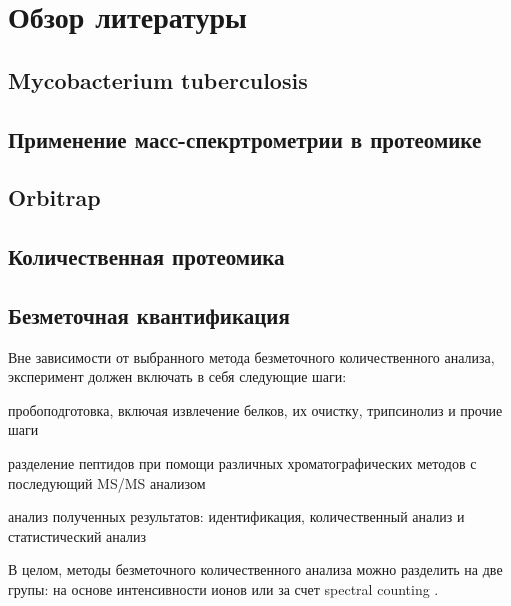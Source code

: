 \section{Обзор литературы}

\subsection{Mycobacterium tuberculosis}

\subsection{Применение масс-спекртрометрии в протеомике}

\subsection{Orbitrap}

\subsection{Количественная протеомика}




\subsection{Безметочная квантификация}
Вне зависимости от выбранного метода безметочного количественного анализа, эксперимент должен включать в себя следующие шаги:
\begin{inparaenum}
    \item  пробоподготовка, включая извлечение белков, их очистку, трипсинолиз и прочие шаги 
    \item разделение пептидов при помощи различных хроматографических методов с 
    последующий MS/MS анализом 
    \item анализ полученных результатов: идентификация, количественный анализ и статистический анализ
\end{inparaenum}
В целом, методы безметочного количественного анализа можно разделить на две групы: на основе интенсивности ионов или за счет spectral counting \cite{zhu2009mass}.


